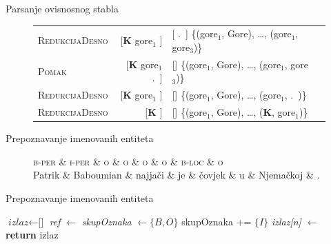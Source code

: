 \documentclass{beamer}
\begin{document}
\begin{frame}{Parsanje ovisnosnog stabla}
\begin{figure}
\begin{tabular}{l|rlm{4cm}}
    \textsc{RedukcijaDesno}   & {[}\textbf{K} gore$_1$ {]}                          & {[} .~{]}                                                                   \qquad \{(gore$_1$, Gore), \ldots, (gore$_1$, gore$_3$)\}  \\
    \textsc{Pomak}            & {[}\textbf{K} gore$_1$ .~{]}                        & {[}{]}                                                                      \qquad \{(gore$_1$, Gore), \ldots, (gore$_1$, gore$_3$)\}  \\
    \textsc{RedukcijaDesno}   & {[}\textbf{K} gore$_1$ {]}                          & {[}{]}                                                                      \qquad \{(gore$_1$, Gore), \ldots, (gore$_1$, .~)\}  \\
    \textsc{RedukcijaDesno}   & {[}\textbf{K} {]}                                   & {[}{]}                                                                      \qquad \{(gore$_1$, Gore), \ldots, (\textbf{K}, gore$_1$)\}  \\
    \end{tabular}
  \end{figure}
\end{frame}

\begin{frame}{Prepoznavanje imenovanih entiteta}
  \begin{figure}[H]
  \centering
  \begin{dependency}
  \begin{deptext}
    \textsc{b-per} \& \textsc{i-per} \& \textsc{o} \& \textsc{o} \& \textsc{o} \& \textsc{o} \& \textsc{b-loc} \& \textsc{o} \\
    Patrik         \& Baboumian      \& najjači    \& je         \& čovjek     \& u          \& Njemačkoj      \& .          \\
  \end{deptext}
  \end{dependency}
  \end{figure}
\end{frame}

\begin{frame}{Prepoznavanje imenovanih entiteta}
  \begin{algorithm}[H]
  \begin{algorithmic}[1]
  \State $\textit{izlaz} \gets \text{[]}$
    \State \textit{ref} $\gets$ 
    \State \textit{skupOznaka} $\gets \{B,O\}$
      \State skupOznaka += $\{I\}$
    \EndIf
    \State \textit{izlaz[n]} $\gets$ 
  \EndFor
  \State {}
  \State \textbf{return} izlaz
  \EndFunction
  \end{algorithmic}
  \end{algorithm}
\end{frame}
\end{document}
